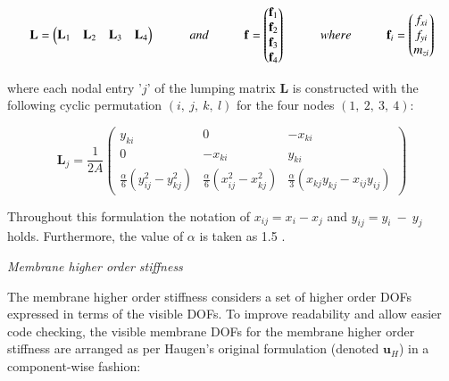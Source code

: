 \begin{equation} 
\mathbf{L} =
\begin{pmatrix}
\mathbf{L}_1 & \mathbf{L}_2 & \mathbf{L}_3 & \mathbf{L}_4
\end{pmatrix}
\hspace{10mm}
and
\hspace{10mm}
\mathbf{f} =
\begin{pmatrix}
\mathbf{f}_1 \\
\mathbf{f}_2 \\
\mathbf{f}_3 \\
\mathbf{f}_4
\end{pmatrix}
\hspace{10mm}
where
\hspace{10mm}
\mathbf{f}_i =
\begin{pmatrix}
{f_{xi}} \\
{f_{yi}} \\
{m_{zi}}
\end{pmatrix}
\label{equation06}
\end{equation}

where each nodal entry '$j$' of the lumping matrix $\mathbf{L}$ is constructed with the following cyclic permutation $(i,\ j,\ k,\ l)$ for the four nodes $(1,\ 2,\ 3,\ 4)$:

\begin{equation} 
\mathbf{L}_j = \frac{1}{2 A}
\begin{pmatrix}
y_{ki} & 0 & -x_{ki} \\
0 & -x_{ki} & y_{ki} \\
\frac{\alpha}{6}(y_{ij}^2 - y_{kj}^2 ) & \frac{\alpha}{6}(x_{ij}^2 - x_{kj}^2 ) & \frac{\alpha}{3}(x_{kj}y_{kj} - x_{ij}y_{ij})
\end{pmatrix}
\label{equation07}
\end{equation}

Throughout this formulation the notation of $x_{ij} = x_i - x_j$ and $y_{ij} = y_i\ -\ y_j$ holds. Furthermore, the value of $\alpha$ is taken as 1.5 \cite{Fel91}.

\textit{Membrane higher order stiffness}

The membrane higher order stiffness considers a set of higher order DOFs expressed in terms of the visible DOFs. To improve readability and allow easier code checking, the visible membrane DOFs for the membrane higher order stiffness are arranged as per Haugen's original formulation \cite{Hau94} (denoted $\mathbf{u}_H$) in a component-wise fashion:

